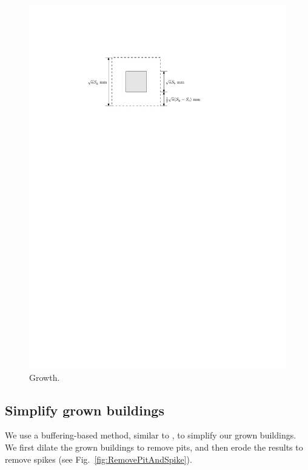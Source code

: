 \documentclass[graybox]{svmult}
\newcommand{\fig}{Fig.~}
\begin{document}
\begin{figure}[tb]
	\centering
	\includegraphics{Growth}
	\caption{Growth.}
	\label{fig:Growth}
\end{figure}




\subsection{Simplify grown buildings}
\label{sec:Simplify}
We use a buffering-based method, 
similar to \textcite{Damen2008,Meijers2016}, 
to simplify our grown buildings. 
We first dilate the grown buildings to remove 
pits, and then erode the results to remove spikes
(see \fig\ref{fig:RemovePitAndSpike}).
\end{document}
